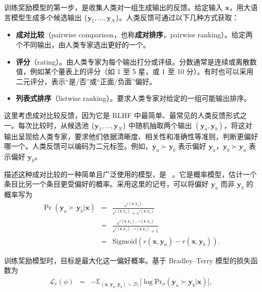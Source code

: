 训练奖励模型的第一步，是收集人类对一组生成输出的反馈。给定输入 $\mathbf{x}$，用大语言模型生成多个候选输出 $\{\mathbf{y}_1,...,\mathbf{y}_N\}$。人类反馈可通过以下几种方式获取：

\begin{itemize}
\item \vspace{0.5cm} \textbf{成对比较}（pairwise comparison，也称\textbf{成对排序}，pairwise ranking）。给定两个不同输出，由人类专家选出更好的一个。
\item \vspace{0.3cm} \textbf{评分}（rating）。由人类专家为每个输出打分或评级。分数通常是连续或离散数值，例如某个量表上的评分（如 1 至 5 星，或 1 至 10 分）。有时也可以采用二元评分，表示“是/否”或“正面/负面”偏好。
\item \vspace{0.3em} \textbf{列表式排序}（listwise ranking）。要求人类专家对给定的一组可能输出排序。
\end{itemize}
\vspace{0.5em}

这里考虑成对比较反馈，因为它是 RLHF 中最简单、最常见的人类反馈形式之一。每次比较时，从候选池 $\{\mathbf{y}_1,...,\mathbf{y}_N\}$ 中随机抽取两个输出 $(\mathbf{y}_a,\mathbf{y}_b)$，将这对输出呈现给人类专家，要求他们依据清晰度、相关性和准确性等准则，判断更偏好哪一个。人类反馈可以编码为二元标签。例如，$\mathbf{y}_a \succ \mathbf{y}_b$ 表示偏好 $\mathbf{y}_a$，$\mathbf{y}_b \succ \mathbf{y}_a$ 表示偏好 $\mathbf{y}_b$。

描述这种成对比较的一种简单且广泛使用的模型，是 ~\cite{bradley-and-terry:rank}。它是概率模型，估计一个条目比另一个条目更受偏好的概率。采用这里的记号，可以将偏好 $\mathbf{y}_a$ 而非 $\mathbf{y}_b$ 的概率写为
\begin{eqnarray}
\Pr(\mathbf{y}_a \succ \mathbf{y}_b | \mathbf{x}) & = & \frac{e^{r(\mathbf{x},\mathbf{y}_a)}}{e^{r(\mathbf{x},\mathbf{y}_a)} + e^{r(\mathbf{x},\mathbf{y}_b)}} \nonumber \\
                                                  & = & \frac{e^{r(\mathbf{x},\mathbf{y}_a)-r(\mathbf{x},\mathbf{y}_b)}}{e^{r(\mathbf{x},\mathbf{y}_a)-r(\mathbf{x},\mathbf{y}_b)}+1} \nonumber \\
                                                  & = & \mathrm{Sigmoid}(r(\mathbf{x},\mathbf{y}_a)-r(\mathbf{x},\mathbf{y}_b)).
\end{eqnarray}

训练奖励模型时，目标是最大化这一偏好概率。基于 Bradley–Terry 模型的损失函数为
\begin{eqnarray}
\mathcal{L}_r(\phi) & = & -\mathbb{E}_{(\mathbf{x},\mathbf{y}_a,\mathbf{y}_b) \sim \mathcal{D}_r} \big[ \log \mathrm{Pr}_{\phi}(\mathbf{y}_a \succ \mathbf{y}_b | \mathbf{x}) \big], \label{eq:pairwise-reward-loss-expectation}
\end{eqnarray}

